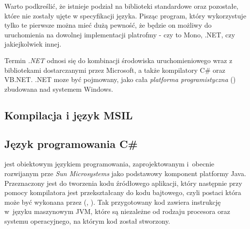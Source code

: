 Warto podkreślić, że istnieje podział na biblioteki standardowe oraz pozostałe, które nie zostały ujęte w specyfikacji języka. Pisząc program, który wykorzystuje tylko te pierwsze można mieć dużą pewność, że będzie on możliwy do uruchomienia na dowolnej implementacji platrofmy - czy to Mono, .NET, czy jakiejkolwiek innej.

Termin \emph{.NET} odnosi się do kombinacji środowiska uruchomieniowego wraz z bibliotekami dostarczanymi przez Microsoft, a także kompilatory C\# oraz VB.NET. .NET moze być pojmowany, jako cała \emph{platforma programistyczna} () zbudowana nad systemem Windows.


\subsection{Kompilacja i język MSIL}\label{sec:msil}

\subsection{Język programowania C\#}
 jest obiektowym językiem programowania, zaprojektowanym i~obecnie rozwijanym prze \emph{Sun Microsystems} jako podstawowy komponent platformy Java. Przeznaczony jest do tworzenia kodu źródłowego aplikacji, który następnie przy pomocy kompilatora jest przekształcany do kodu bajtowego, czyli postaci która może być wykonana przez  (, ). Tak przygotowany kod zawiera instrukcję w~języku maszynowym JVM, które są niezależne od rodzaju procesora oraz systemu operacyjnego, na którym kod został stworzony.


